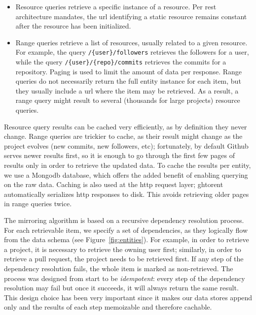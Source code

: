 \documentclass[conference]{IEEEtran}
\begin{document}
\begin{itemize}

  \item Resource queries retrieve a specific instance of a resource. Per 
    {\sc rest} architecture mandates, the {\sc url} identifying a static
    resource remains constant after the resource has been initialized. 

  \item Range queries retrieve a list of resources, usually related to a given
    resource. For example, the query \texttt{/\{user\}/followers} retrieves the
    followers for a user, while the query \texttt{/\{user\}/\{repo\}/commits}
    retrieves the commits for a repository. Paging is used to limit the amount
    of data per response. Range queries do not necessarily return the full
    entity instance for each item, but they usually include a {\sc url} where
    the item may be retrieved. As a result, a range query might result to
    several (thousands for large projects) resource queries.

\end{itemize}

Resource query results can be cached very efficiently, as by definition they never change. Range queries are trickier to cache, as their result might
change as the project evolves (new commits, new followers, etc); fortunately, by
default Github serves newer results first, so it is enough to go through the
first few pages of results only in order to retrieve the updated data. To cache
the results per entity, we use a Mongo{\sc db} database, which offers the added
benefit of enabling querying on the raw data. Caching is also used at the {\sc
http} request layer; {\sc ght}orent automatically serializes {\sc http}
responses to disk. This avoids retrieving older pages in range queries twice.

%
The mirroring algorithm is based on a recursive dependency resolution process.
For each retrievable item, we specify a set of dependencies, as they logically
flow from the data schema (see Figure~\ref{fig:entities}). For example, in order
to retrieve a \textsf{project}, it is necessary to retrieve the owning
\textsf{user} first; similarly, in order to retrieve a pull request, the
\textsf{project} needs to be retrieved first. If any step of the dependency
resolution fails, the whole item is marked as non-retrieved.  The process was
designed from start to be \emph{idempotent}: every step of the dependency
resolution may fail but once it succeeds, it will always return the same result.
This design choice has been very important since it makes our data stores append
only and the results of each step memoizable and therefore cachable.
\end{document}
